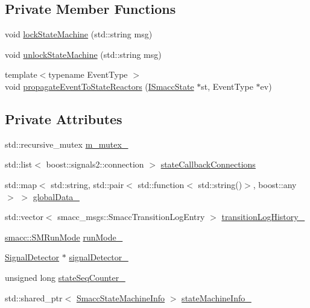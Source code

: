 \subsection*{Private Member Functions}
\begin{DoxyCompactItemize}
\item 
void \hyperlink{classsmacc_1_1ISmaccStateMachine_a5c8d4c9a4b11c7950266a00e48080ce3}{lock\+State\+Machine} (std\+::string msg)
\item 
void \hyperlink{classsmacc_1_1ISmaccStateMachine_ae2e3ceb87bfe3f9d8bf320e36071fdc7}{unlock\+State\+Machine} (std\+::string msg)
\item 
{\footnotesize template$<$typename Event\+Type $>$ }\\void \hyperlink{classsmacc_1_1ISmaccStateMachine_a3d369c7cff22632ca85a8656000ba19c}{propagate\+Event\+To\+State\+Reactors} (\hyperlink{classsmacc_1_1ISmaccState}{I\+Smacc\+State} $\ast$st, Event\+Type $\ast$ev)
\end{DoxyCompactItemize}
\subsection*{Private Attributes}
\begin{DoxyCompactItemize}
\item 
std\+::recursive\+\_\+mutex \hyperlink{classsmacc_1_1ISmaccStateMachine_aac785541646e5c517273bf31072505a1}{m\+\_\+mutex\+\_\+}
\item 
std\+::list$<$ boost\+::signals2\+::connection $>$ \hyperlink{classsmacc_1_1ISmaccStateMachine_aaf98bb0edaa5d8c84767e4acfad3548d}{state\+Callback\+Connections}
\item 
std\+::map$<$ std\+::string, std\+::pair$<$ std\+::function$<$ std\+::string()$>$, boost\+::any $>$ $>$ \hyperlink{classsmacc_1_1ISmaccStateMachine_ad2f9dae184ea942db632ac4532a10a91}{global\+Data\+\_\+}
\item 
std\+::vector$<$ smacc\+\_\+msgs\+::\+Smacc\+Transition\+Log\+Entry $>$ \hyperlink{classsmacc_1_1ISmaccStateMachine_af682d5fce5bb7c959e2b8814dae50023}{transition\+Log\+History\+\_\+}
\item 
\hyperlink{namespacesmacc_a3e4f79486ea6ea6342dd3c712d16a4f6}{smacc\+::\+S\+M\+Run\+Mode} \hyperlink{classsmacc_1_1ISmaccStateMachine_a9f8cfbf577f7ae7a48b7a328e2e6b589}{run\+Mode\+\_\+}
\item 
\hyperlink{classsmacc_1_1SignalDetector}{Signal\+Detector} $\ast$ \hyperlink{classsmacc_1_1ISmaccStateMachine_a3982eb671f5f001cb047d3a467789986}{signal\+Detector\+\_\+}
\item 
unsigned long \hyperlink{classsmacc_1_1ISmaccStateMachine_ab41ee07d20715142e2f7c92d551b2bd6}{state\+Seq\+Counter\+\_\+}
\item 
std\+::shared\+\_\+ptr$<$ \hyperlink{classsmacc_1_1introspection_1_1SmaccStateMachineInfo}{Smacc\+State\+Machine\+Info} $>$ \hyperlink{classsmacc_1_1ISmaccStateMachine_a0914aa27c3f51374c338d89a32b135d1}{state\+Machine\+Info\+\_\+}
\end{DoxyCompactItemize}
